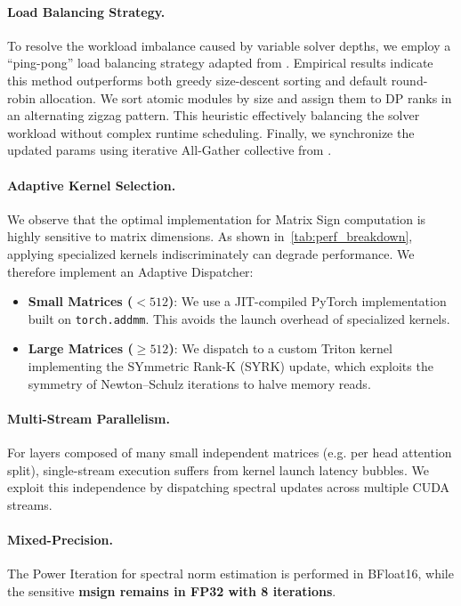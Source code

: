 \paragraph{Load Balancing Strategy.}
To resolve the workload imbalance caused by variable solver depths, we employ a ``ping-pong'' load balancing strategy adapted from \citep{emergeing_optimizer}. Empirical results indicate this method outperforms both greedy size-descent sorting and default round-robin allocation. We sort atomic modules by size and assign them to DP ranks in an alternating zigzag pattern. This heuristic effectively balancing the solver workload without complex runtime scheduling.
Finally, we synchronize the updated params using iterative All-Gather collective from \cite{emergeing_optimizer}.
\paragraph{Adaptive Kernel Selection.}
We observe that the optimal implementation for Matrix Sign computation is highly sensitive to matrix dimensions. As shown in~\cref{tab:perf_breakdown}, applying specialized kernels indiscriminately can degrade performance. We therefore implement an Adaptive Dispatcher:
\begin{itemize}[left=0pt]
    \item \textbf{Small Matrices (\(<512\))}: We use a JIT-compiled PyTorch implementation built on \texttt{torch.addmm}. This avoids the launch overhead of specialized kernels.
    \item \textbf{Large Matrices ($\ge512$)}: We dispatch to a custom Triton kernel implementing the SYmmetric Rank-K (SYRK)  \cite{emergeing_optimizer} update, which exploits the symmetry of Newton--Schulz iterations to halve memory reads.
\end{itemize}

\paragraph{Multi-Stream Parallelism.}
For layers composed of many small independent matrices (e.g. per head attention split), single-stream execution suffers from kernel launch latency bubbles. We exploit this independence by dispatching spectral updates across multiple CUDA streams.

\paragraph{Mixed-Precision.}
The Power Iteration for spectral norm estimation is performed in BFloat16, while the sensitive \textbf{msign remains in FP32 with 8 iterations}.

